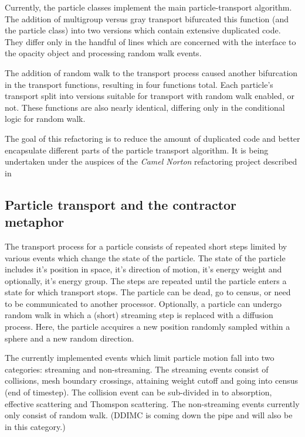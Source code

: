 \documentclass[memo]{ResearchNote}
\begin{document}
Currently, the particle classes implement the main particle-transport
algorithm.  The addition of multigroup versus gray transport
bifurcated this function (and the particle class) into two versions
which contain extensive duplicated code. They differ only in the
handful of lines which are concerned with the interface to the opacity
object and processing random walk events.

The addition of random walk to the transport process caused another
bifurcation in the transport functions, resulting in four functions
total. Each particle's transport split into versions suitable for
transport with random walk enabled, or not. These functions are also
nearly identical, differing only in the conditional logic for random
walk.

The goal of this refactoring is to reduce the amount of duplicated
code and better encapsulate different parts of the particle transport
algorithm. It is being undertaken under the auspices of the {\em Camel
  Norton} refactoring project described in~\cite{ccs-4:04-13}

\subsection{Particle transport and the contractor metaphor}

The transport process for a particle consists of repeated short steps
limited by various events which change the state of the particle. The
state of the particle includes it's position in space, it's direction
of motion, it's energy weight and optionally, it's energy group. The
steps are repeated until the particle enters a state for which
transport stops. The particle can be dead, go to census, or need to be
communicated to another processor.  Optionally, a particle can undergo
random walk in which a (short) streaming step is replaced with a
diffusion process.  Here, the particle accquires a new position
randomly sampled within a sphere and a new random direction.

The currently implemented events which limit particle motion fall into
two categories: streaming and non-streaming. The streaming events
consist of collisions, mesh boundary crossings, attaining weight
cutoff and going into census (end of timestep). The collision event
can be sub-divided in to absorption, effective scattering and Thomspon
scattering. The non-streaming events currently only consist of random
walk. (DDIMC is coming down the pipe and will also be in this
category.)
\end{document}
